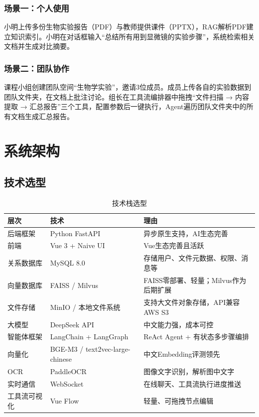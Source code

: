 \documentclass[a4paper,zihao=-4]{ctexart}
\begin{document}
\subsubsection{场景一：个人使用}

小明上传多份生物实验报告（PDF）与教师提供课件（PPTX），RAG解析PDF建立知识索引。小明在对话框输入“总结所有用到显微镜的实验步骤”，系统检索相关文档并生成对比摘要。

\subsubsection{场景二：团队协作}

课程小组创建团队空间“生物学实验”，邀请3位成员。成员上传各自的实验数据到团队文件夹，在文档上批注讨论。组长在工具流编排器中拖拽“文件扫描 → 内容提取 →
汇总报告”三个工具，配置参数后一键执行，Agent遍历团队文件夹中的所有文档生成汇总报告。

\section{系统架构}

\subsection{技术选型}

\begin{table}[H]
  \centering
  \caption{技术栈选型}
  \begin{tabular}{p{2.5cm}p{4cm}p{6.5cm}}
    \toprule
    层次         & 技术                            & 理由
    \\
    \midrule
    后端框架     & Python FastAPI                  & 异步原生支持，AI生态完善
    \\
    前端         & Vue 3 + Naive UI                & Vue生态完善且活跃
    \\
    关系数据库   & MySQL 8.0                       & 存储用户、文件元数据、权限、消息等 \\
    向量数据库   & FAISS / Milvus                  &
    FAISS零部署、轻量；Milvus作为后期扩展
    \\
    文件存储     & MinIO / 本地文件系统            & 支持大文件对象存储，API兼容AWS S3
    \\
    大模型       & DeepSeek API                    & 中文能力强，成本可控
    \\
    智能体框架   & LangChain + LangGraph           & ReAct Agent + 有状态多步骤编排
    \\
    向量化       & BGE-M3 / text2vec-large-chinese & 中文Embedding评测领先
    \\
    OCR          & PaddleOCR                       &
    图像文字识别，解析图中文字
    \\
    实时通信     & WebSocket                       & 在线聊天、工具流执行进度推送
    \\
    工具流可视化 & Vue Flow                        & 轻量、可拖拽节点编辑
    \\
    \bottomrule
  \end{tabular}
\end{table}
\end{document}
